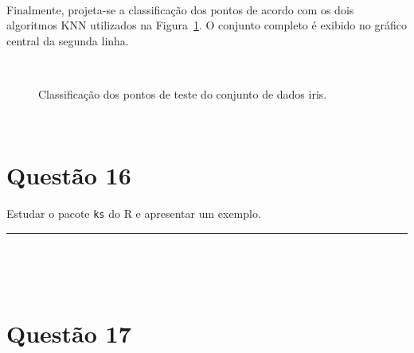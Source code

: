 \documentclass[
  a4paperpaper,
]{article}
\begin{document}
~

Finalmente, projeta-se a classificação dos pontos de acordo com os dois
algoritmos KNN utilizados na Figura~\ref{fig-knniris}. O conjunto
completo é exibido no gráfico central da segunda linha.

~

\begin{figure}[H]


\caption{\label{fig-knniris}Classificação dos pontos de teste do
conjunto de dados iris.}

\end{figure}%

~

\section{Questão 16}\label{questuxe3o-16}

Estudar o pacote \texttt{ks} do R e apresentar um exemplo.

\begin{center}\rule{0.5\linewidth}{0.5pt}\end{center}

~

~

\section{Questão 17}\label{questuxe3o-17}
\end{document}
